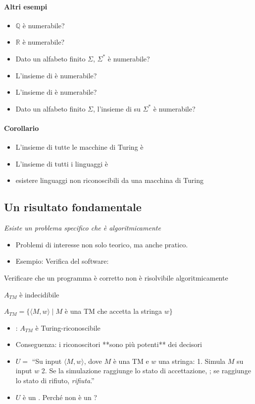 \paragraph{Altri esempi}
\begin{itemize}
	\item $\mathbb{Q}$ è numerabile? 
	\item $\mathbb{R}$ è numerabile? 
	\item Dato un alfabeto finito $\Sigma$, $\Sigma^*$ è numerabile? 
	\item L'insieme di  è numerabile? 
	\item L'insieme di  è numerabile? 
	\item Dato un alfabeto finito $\Sigma$, l'insieme di  su $\Sigma^*$ è numerabile? 
\end{itemize}

\paragraph{Corollario}
\begin{itemize}
	\item L'insieme di tutte le macchine di Turing è  
	\item L'insieme di tutti i linguaggi è  
	\item {} esistere linguaggi non riconoscibili da una macchina di Turing 
\end{itemize}

\subsection{Un risultato fondamentale}
\textit{Esiste un problema specifico che è algoritmicamente }
\begin{itemize}
	\item Problemi di interesse non solo teorico, ma anche pratico.
	\item Esempio: Verifica del software: 
\end{itemize}
Verificare che un programma è corretto non è risolvibile algoritmicamente 
\begin{theorem}
	$A_{TM}$ è indecidibile
\end{theorem}
$A_{TM}=\{\langle M,w\rangle\mid M$ è una TM che accetta la stringa $w\}$ 
\begin{itemize}
	\item {}: $A_{TM}$ è Turing-riconoscibile
	\item Conseguenza: i riconoscitori **sono più potenti** dei decisori
	\item $U=$ ``Su input $\langle M,w\rangle$, dove $M$ è una TM e $w$ una stringa: 
		1. Simula $M$ su input $w$ 
		2. Se la simulazione raggiunge lo stato di accettazione, ; se raggiunge lo stato di rifiuto, \textit{rifiuta}.''
	\item $U$ è un . Perché non è un ? 
\end{itemize}

